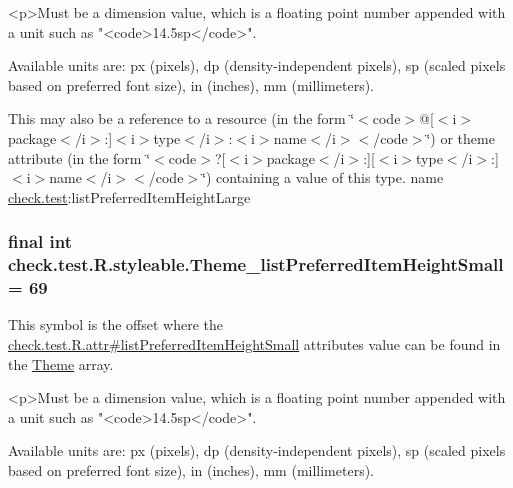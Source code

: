 \begin{DoxyVerb}      <p>Must be a dimension value, which is a floating point number appended with a unit such as "<code>14.5sp</code>".
\end{DoxyVerb}
 Available units are\+: px (pixels), dp (density-\/independent pixels), sp (scaled pixels based on preferred font size), in (inches), mm (millimeters). 

This may also be a reference to a resource (in the form \char`\"{}$<$code$>$@\mbox{[}$<$i$>$package$<$/i$>$\+:\mbox{]}$<$i$>$type$<$/i$>$\+:$<$i$>$name$<$/i$>$$<$/code$>$\char`\"{}) or theme attribute (in the form \char`\"{}$<$code$>$?\mbox{[}$<$i$>$package$<$/i$>$\+:\mbox{]}\mbox{[}$<$i$>$type$<$/i$>$\+:\mbox{]}$<$i$>$name$<$/i$>$$<$/code$>$\char`\"{}) containing a value of this type.  name \hyperlink{namespacecheck_1_1test}{check.\+test}\+:list\+Preferred\+Item\+Height\+Large \hypertarget{classcheck_1_1test_1_1_r_1_1styleable_a59adeb7f43ab4c55c41858885f6d3085}{}
\subsubsection[{Theme\+\_\+list\+Preferred\+Item\+Height\+Small}]{\setlength{\rightskip}{0pt plus 5cm}final int check.\+test.\+R.\+styleable.\+Theme\+\_\+list\+Preferred\+Item\+Height\+Small = 69\hspace{0.3cm}{\ttfamily [static]}}\label{classcheck_1_1test_1_1_r_1_1styleable_a59adeb7f43ab4c55c41858885f6d3085}
This symbol is the offset where the \hyperlink{classcheck_1_1test_1_1_r_1_1attr_a7399d398414e42a4ede3472ad153331c}{check.\+test.\+R.\+attr\#list\+Preferred\+Item\+Height\+Small} attribute\textquotesingle{}s value can be found in the \hyperlink{classcheck_1_1test_1_1_r_1_1styleable_acca726d02016a0cf607782ec3a436a81}{Theme} array.

\begin{DoxyVerb}      <p>Must be a dimension value, which is a floating point number appended with a unit such as "<code>14.5sp</code>".
\end{DoxyVerb}
 Available units are\+: px (pixels), dp (density-\/independent pixels), sp (scaled pixels based on preferred font size), in (inches), mm (millimeters). 

